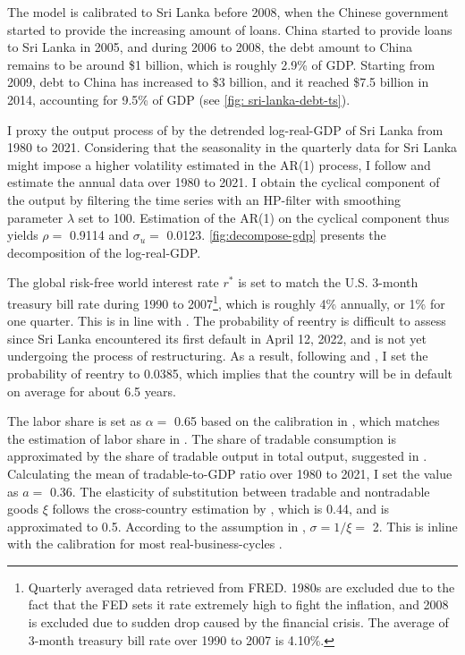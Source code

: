 The model is calibrated to Sri Lanka before 2008, when the Chinese government started to provide the increasing amount of loans.
China started to provide loans to Sri Lanka in 2005, and during 2006 to 2008, the debt amount to China remains to be around \$1 billion, which is roughly 2.9\% of GDP. Starting from 2009, debt to China has increased to \$3 billion, and it reached \$7.5 billion in 2014, accounting for 9.5\% of GDP
(see \autoref{fig: sri-lanka-debt-ts}).

I proxy the output process of  by the detrended log-real-GDP of Sri Lanka from 1980 to 2021. Considering that the seasonality in the quarterly data for Sri Lanka might impose a higher volatility estimated in the AR(1) process, I follow \citet{Hinrichsen_2020-chapter4} and estimate the annual data over 1980 to 2021. I obtain the cyclical component of the output by filtering the time series with an HP-filter with smoothing parameter $\lambda$ set to 100.
Estimation of the AR(1) on the cyclical component thus yields $\rho = $ 0.9114 and $\sigma_u = $ 0.0123\footnotemark{}. \autoref{fig:decompose-gdp} presents the decomposition of the log-real-GDP.

The global risk-free world interest rate $r^*$ is set to match the U.S. 3-month treasury bill rate during 1990 to 2007\footnote{
    Quarterly averaged data retrieved from FRED. 1980s are excluded due to the fact that the FED sets it rate extremely high to fight the inflation, and 2008 is excluded due to sudden drop caused by the financial crisis. The average of 3-month treasury bill rate over 1990 to 2007 is 4.10\%.
}, which is roughly 4\% annually, or 1\% for one quarter. This is in line with \citet{Chatterjee-12}.
The probability of reentry is difficult to assess since Sri Lanka encountered its first default in April 12, 2022, and is not yet undergoing the process of restructuring. As a result, following \citet*{Chatterjee-12} and \citet*{Hinrichsen_2020-chapter4}, I set the probability of reentry to 0.0385, which implies that the country will be in default on average for about 6.5 years.

The labor share is set as $\alpha=$ 0.65 based on the calibration in \citet*{Jegajeevan-Sri-Lanka-DSGE}, which matches the estimation of labor share in \citet{duma2007sri}. The share of tradable consumption is approximated by the share of tradable output in total output, suggested in \citet{Uribe-Schmitt-Grohe-textbook}. Calculating the mean of tradable-to-GDP ratio over 1980 to 2021, I set the value as $a =$ 0.36. The elasticity of substitution between tradable and nontradable goods $\xi$ follows the cross-country estimation by \citet*{Stockman-Tesar-95}, which is 0.44, and is approximated to 0.5. According to the assumption in , $\sigma=1/\xi=$ 2. This is inline with the calibration for most real-business-cycles \citep{Uribe-Schmitt-Grohe-textbook,Na-18}.

